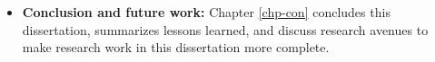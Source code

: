 \begin{itemize}

\item \textbf{Conclusion and future work:} Chapter \ref{chp-con} concludes this
dissertation, summarizes lessons learned, and discuss research avenues to make
research work in this dissertation more complete.

\end{itemize}
